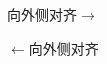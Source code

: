 \def\outside#1{%
  \checkoddpage %
  \ifoddpage    %
    {\raggedleft #1$\rightarrow$}%
  \else
    {\raggedright $\leftarrow$#1}%
  \fi}
\outside{\textsf{向外侧对齐}}
